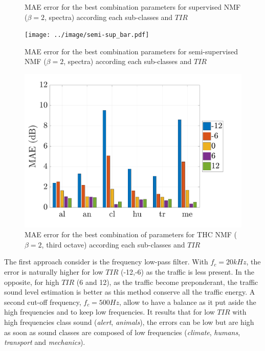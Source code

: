 \documentclass[twocolumn,a4paper,10pt]{article}
\begin{document}
\begin{figure}[hbtp]
\centering

\caption{MAE error for the best combination parameters for supervised NMF ($\beta = 2$, spectra) according each sub-classes and $TIR$}
\label{tab:Sup_error}
\end{figure}

\begin{figure}[hbtp]
\centering
\texttt{[image: ../image/semi-sup\_bar.pdf]}
\caption{MAE error for the best combination parameters for semi-supervised NMF ($\beta = 2$, spectra) according each sub-classes and $TIR$}
\label{tab:Semi_error}
\end{figure}

\begin{figure}[hbtp]
\centering
\includegraphics[width=\linewidth]{../image/THC_bar.pdf}
\caption{MAE error for the best combination of parameters for THC NMF ($\beta = 2$, third octave) according each sub-classes and $TIR$}
\label{tab:THC_error}
\end{figure}

The first approach consider is the frequency low-pass filter. With $f_c = 20 kHz$, the error is naturally higher for low $TIR$ (-12,-6) as the traffic is less present. In the opposite, for high $TIR$ (6 and 12), as the traffic become preponderant, the traffic  sound level estimation is better as this method conserve all the traffic energy. A second cut-off frequency, $f_c = 500 Hz$, allow to have a balance as it put aside the high frequencies and to keep low frequencies. It results that for low $TIR$ with high frequencies class sound (\textit{alert}, \textit{animals}), the errors can be low but are high as soon as sound classes are composed of low frequencies (\textit{climate}, \textit{humans}, \textit{transport} and \textit{mechanics}). 
\end{document}
